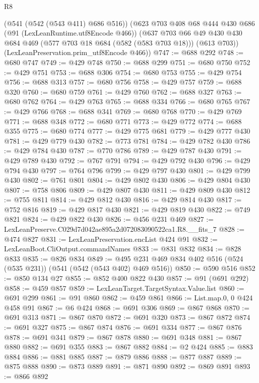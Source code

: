 \begin{lexlean}{R8}
\begin{coremodule}
    (@541 (@542 (@543 @411) @686 @516))
    (@623
      @703
      @408
      @68
      @444
      @430
      @686
      (@91 (LexLeanRuntime.utf8Encode @466))
      (@637
        @703
        @66
        @49
        @430
        @430
        @684
        @469
        (@577 @703 @18 @684 (@582 (@583 @703 @18)))
        (@613 @703))
      (LexLeanPreservation.prim_utf8Encode @466))
@747 := @688 @292
@748 := @680 @747
@749 := @429 @748
@750 := @688 @299
@751 := @680 @750
@752 := @429 @751
@753 := @688 @306
@754 := @680 @753
@755 := @429 @754
@756 := @688 @313
@757 := @680 @756
@758 := @429 @757
@759 := @688 @320
@760 := @680 @759
@761 := @429 @760
@762 := @688 @327
@763 := @680 @762
@764 := @429 @763
@765 := @688 @334
@766 := @680 @765
@767 := @429 @766
@768 := @688 @341
@769 := @680 @768
@770 := @429 @769
@771 := @688 @348
@772 := @680 @771
@773 := @429 @772
@774 := @688 @355
@775 := @680 @774
@777 := @429 @775 @681
@779 := @429 @777 @430
@781 := @429 @779 @430
@782 := @773 @781
@784 := @429 @782 @430
@786 := @429 @784 @430
@787 := @770 @786
@789 := @429 @787 @430
@791 := @429 @789 @430
@792 := @767 @791
@794 := @429 @792 @430
@796 := @429 @794 @430
@797 := @764 @796
@799 := @429 @797 @430
@801 := @429 @799 @430
@802 := @761 @801
@804 := @429 @802 @430
@806 := @429 @804 @430
@807 := @758 @806
@809 := @429 @807 @430
@811 := @429 @809 @430
@812 := @755 @811
@814 := @429 @812 @430
@816 := @429 @814 @430
@817 := @752 @816
@819 := @429 @817 @430
@821 := @429 @819 @430
@822 := @749 @821
@824 := @429 @822 @430
@826 := @456 @231 @469
@827 := LexLeanPreserve.C029d7d042ae895a2d072083090522ca1.R8.__fits_7
@828 := @474 @827
@831 := LexLeanPreservation.encList @424 @91
@832 := LexLeanBoot.CliOutput.commandNames
@833 := @831 @832
@834 := @828 @833
@835 := @826 @834
@849 := @495 @231 @469 @834 @402 @516 (@524 (@535 @231)) (@541 (@542 (@543 @402) @469 @516))
@850 := @590 @516
@852 := @850 @134 @27
@855 := @852 @400 @822 @430
@857 := @91 (@691 @292)
@858 := @459 @857
@859 := LexLeanTarget.TargetSyntax.Value.list
@860 := @691 @299
@861 := @91 @860
@862 := @459 @861
@866 := List.map.{0, 0} @424 @458 @91
@867 := @6 @424
@868 := @691 @306
@869 := @867 @868
@870 := @691 @313
@871 := @867 @870
@872 := @691 @320
@873 := @867 @872
@874 := @691 @327
@875 := @867 @874
@876 := @691 @334
@877 := @867 @876
@878 := @691 @341
@879 := @867 @878
@880 := @691 @348
@881 := @867 @880
@882 := @691 @355
@883 := @867 @882
@884 := @2 @424
@885 := @883 @884
@886 := @881 @885
@887 := @879 @886
@888 := @877 @887
@889 := @875 @888
@890 := @873 @889
@891 := @871 @890
@892 := @869 @891
@893 := @866 @892

\end{coremodule}
\end{lexlean}
